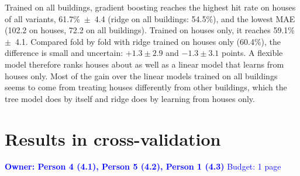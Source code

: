 \documentclass[11pt,a4paper]{article}
\newcommand{\owner}[2]{\noindent\textcolor{blue}{\textbf{Owner: #1} \quad Budget: #2}\par\medskip}
\begin{document}
Trained on all buildings, gradient boosting reaches the highest hit rate on houses of all variants,
61.7\%~$\pm$~4.4 (ridge on all buildings: 54.5\%), and the lowest MAE (102.2 on houses, 72.2 on all
buildings). Trained on houses only, it reaches 59.1\%~$\pm$~4.1. Compared fold by fold with ridge
trained on houses only (60.4\%), the difference is small and uncertain: $+1.3 \pm 2.9$ and
$-1.3 \pm 3.1$ points. A flexible model therefore ranks houses about as well as a linear model that
learns from houses only. Most of the gain over the linear models trained on all buildings seems to
come from treating houses differently from other buildings, which the tree model does by itself and
ridge does by learning from houses only.

\section{Results in cross-validation}
\owner{Person 4 (4.1), Person 5 (4.2), Person 1 (4.3)}{1 page}
\end{document}
